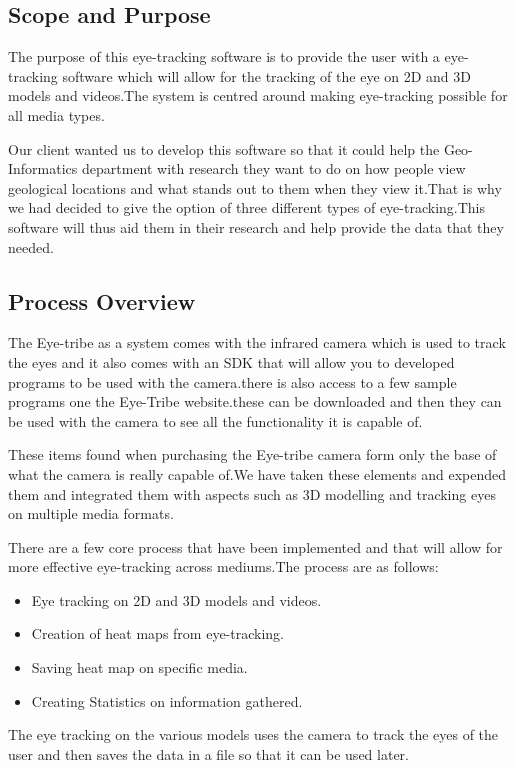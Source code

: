 \subsection{Scope and Purpose}
The purpose of this eye-tracking software is to provide the user with a eye-tracking software which will allow for the tracking of the eye on 2D and 3D models and videos.The system is centred around making eye-tracking possible for all media types.

Our client wanted us to develop this software so that it could help the Geo-Informatics department with research they want to do on how people view geological locations and what stands out to them when they view it.That is why we had decided to give the option of three different types of eye-tracking.This software will thus aid them in their research and help provide the data that they needed.

\subsection{Process Overview }
The Eye-tribe as a system comes with the infrared camera which is used to track the eyes and it also comes with an SDK that will allow you to developed programs to be used with the camera.there is also access to a few sample programs one the Eye-Tribe website.these can be downloaded and then they can be used with the camera to see all the functionality it is capable of.

These items found when purchasing the Eye-tribe camera form only the base of what the camera is really capable of.We have taken these elements and expended them and integrated them with aspects such as 3D modelling and tracking eyes on multiple media formats.

There are a few core process that have been implemented and that will allow for more effective eye-tracking across mediums.The process are as follows:
\begin{itemize}
\item Eye tracking on 2D and 3D models and videos.
\item Creation of heat maps from eye-tracking.
\item Saving heat map on specific media.
\item Creating Statistics on information gathered.
\end{itemize}

The eye tracking on the various models uses the camera to track the eyes of the user and then saves the data in a file so that it can be used later.

